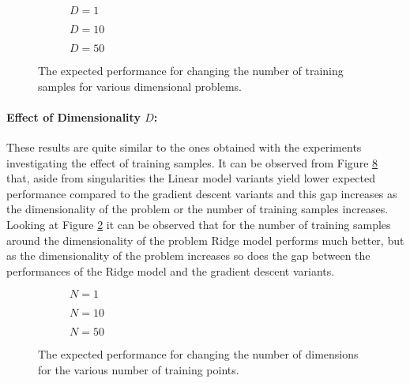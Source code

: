 \begin{figure}[!h]
  \centering
    \begin{subfigure}{0.3\textwidth}
      \centering
      \caption{$D=1$}
      \label{fig:linear-N-D-1}
    \end{subfigure}
    \begin{subfigure}{0.3\textwidth}
      \centering
      \caption{$D=10$}
      \label{fig:linear-N-D-10}
    \end{subfigure}
    \begin{subfigure}{0.3\textwidth}
      \centering
      \caption{$D=50$}
      \label{fig:linear-N-D-50}
    \end{subfigure}
  \caption{The expected performance for changing the number of training samples for various dimensional problems.}\label{fig:linear-N}
\end{figure}


\paragraph{Effect of Dimensionality $D$:} These results are quite similar to the ones obtained with the experiments investigating the effect of training samples. It can be observed from Figure \ref{fig:linear-D} that, aside from singularities the Linear model variants yield lower expected performance compared to the gradient descent variants and this gap increases as the dimensionality of the problem or the number of training samples increases. Looking at Figure \ref{fig:linear-N-D-10} it can be observed that for the number of training samples around the dimensionality of the problem Ridge model performs much better, but as the dimensionality of the problem increases so does the gap between the performances of the Ridge model and the gradient descent variants.

\begin{figure}[!h]
  \centering
    \begin{subfigure}{0.3\textwidth}
      \centering
      \caption{$N=1$}
      \label{fig:linear-D-N-1}
    \end{subfigure}
    \begin{subfigure}{0.3\textwidth}
      \centering
      \caption{$N=10$}
      \label{fig:linear-D-N-10}
    \end{subfigure}
    \begin{subfigure}{0.3\textwidth}
      \centering
      \caption{$N=50$}
      \label{fig:linear-D-N-50}
    \end{subfigure}
  \caption{The expected performance for changing the number of dimensions for the various number of training points.}\label{fig:linear-D}
\end{figure}


